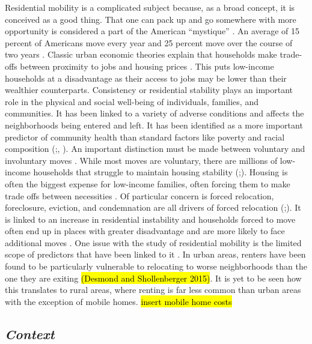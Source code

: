Residential mobility is a complicated subject because, as a broad concept, it is conceived as a good thing. That one can pack up and go somewhere with more opportunity is considered a part of the American “mystique” \citep{molloy_internal_2011}. An average of 15 percent of Americans move every year and 25 percent move over the course of two years \citep{bachmann_ins_2014}. Classic urban economic theories explain that households make trade-offs between proximity to jobs and housing prices \citep{hu_housing_2019}. This puts low-income households at a disadvantage as their access to jobs may be lower than their wealthier counterparts. Consistency or residential stability plays an important role in the physical and social well-being of individuals, families, and communities. It has been linked to a variety of adverse conditions and affects the neighborhoods being entered and left. It has been identified as a more important predictor of community health than standard factors like poverty and racial composition (\citealp{desmond_forced_2015};\citealp{desmond_housing_2016}, \citealp{rauh_housing_2008}). An important distinction must be made between voluntary and involuntary moves \citep{siskar_who_2019}. While most moves are voluntary, there are millions of low-income households that struggle to maintain housing stability (\citealp{phinney_exploring_2013};\citealp{kang_why_2019}). Housing is often the biggest expense for low-income families, often forcing them to make trade offs between necessities \citep{desmond_housing_2015}. Of particular concern is forced relocation, foreclosure, eviction, and condemnation are all drivers of forced relocation (\citealp{phinney_exploring_2013};\citealp{siskar_who_2019}). It is linked to an increase in residential instability and households forced to move often end up in places with greater disadvantage and are more likely to face additional moves \citep{desmond_forced_2015}. One issue with the study of residential mobility is the limited scope of predictors that have been linked to it \citep{kang_why_2019}. In urban areas, renters have been found to be particularly vulnerable to relocating to worse neighborhoods than the one they are exiting \hl{(Desmond and Shollenberger 2015)}. It is yet to be seen how this translates to rural areas, where renting is far less common than urban areas with the exception of mobile homes. \hl{insert mobile home costs}

\subsection{\textit{Context}}

